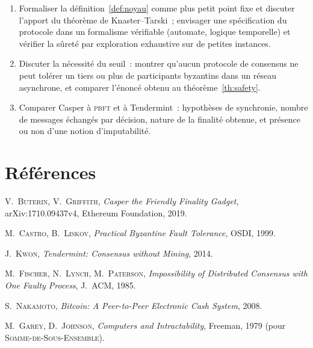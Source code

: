 \documentclass[11pt,a4paper]{article}
\theoremstyle{plain}
\theoremstyle{definition}
\begin{document}
\begin{enumerate}[leftmargin=2em,itemsep=3pt]
\item Formaliser la définition~\ref{def:noyau} comme plus petit point fixe et discuter
l'apport du théorème de Knaster--Tarski~; envisager une spécification du protocole dans un
formalisme vérifiable (automate, logique temporelle) et vérifier la sûreté par exploration
exhaustive sur de petites instances.

\item Discuter la nécessité du seuil~: montrer qu'aucun protocole de consensus ne peut
tolérer un tiers ou plus de participants byzantins dans un réseau asynchrone, et comparer
l'énoncé obtenu au théorème~\ref{th:safety}.

\item Comparer Casper à \textsc{pbft} et à Tendermint~: hypothèses de synchronie, nombre de
messages échangés par décision, nature de la finalité obtenue, et présence ou non d'une
notion d'imputabilité.
\end{enumerate}

\section*{Références}
\begin{enumerate}[label={[\arabic*]},leftmargin=2.4em,itemsep=1pt,font=\small]
\item[{[1]}] {\small V.~\textsc{Buterin}, V.~\textsc{Griffith}, \emph{Casper the Friendly
Finality Gadget}, arXiv:1710.09437v4, Ethereum Foundation, 2019.}
\item[{[2]}] {\small M.~\textsc{Castro}, B.~\textsc{Liskov}, \emph{Practical Byzantine Fault
Tolerance}, OSDI, 1999.}
\item[{[3]}] {\small J.~\textsc{Kwon}, \emph{Tendermint: Consensus without Mining}, 2014.}
\item[{[4]}] {\small M.~\textsc{Fischer}, N.~\textsc{Lynch}, M.~\textsc{Paterson},
\emph{Impossibility of Distributed Consensus with One Faulty Process}, J.~ACM, 1985.}
\item[{[5]}] {\small S.~\textsc{Nakamoto}, \emph{Bitcoin: A Peer-to-Peer Electronic Cash
System}, 2008.}
\item[{[6]}] {\small M.~\textsc{Garey}, D.~\textsc{Johnson}, \emph{Computers and
Intractability}, Freeman, 1979 (pour \textsc{Somme-de-Sous-Ensemble}).}
\end{enumerate}
\end{document}
